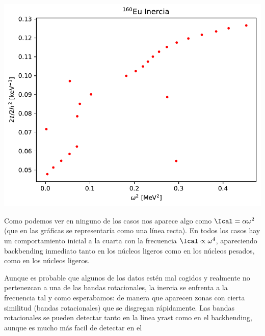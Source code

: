     \begin{center}
        \includegraphics[width=0.6\linewidth]{Cuerpo/Boletin_01/160Eu_inercia.pdf}
    \end{center}
    Como podemos ver en ninguno de los casos nos aparece algo como $\Ical = \alpha \omega^2$ (que en las gráficas se representaría como una línea recta). En todos los casos hay un comportamiento  inicial a la cuarta con la frecuencia $\Ical \propto \omega^4$, apareciendo backbending inmediato tanto en los núcleos ligeros como en los núcleos pesados, como en los núcleos ligeros.

    Aunque es probable que algunos de los datos estén mal cogidos y realmente no pertenezcan a una de las bandas rotacionales, la inercia se enfrenta a la frecuencia tal y como esperabamos: de manera que aparecen zonas con cierta similitud (bandas rotacionales) que se disgregan rápidamente. Las bandas rotacionales se pueden detectar tanto en la línea yrast como en el backbending, aunque es mucho más facil de detectar en el


